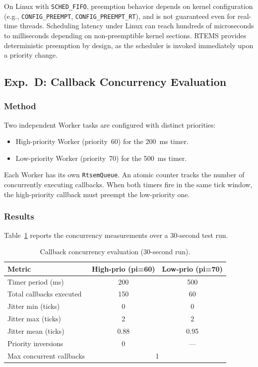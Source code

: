 On Linux with \texttt{SCHED\_FIFO}, preemption behavior depends on kernel configuration (e.g., \texttt{CONFIG\_PREEMPT}, \texttt{CONFIG\_PREEMPT\_RT}), and is not guaranteed even for real-time threads.
Scheduling latency under Linux can reach hundreds of microseconds to milliseconds depending on non-preemptible kernel sections.
RTEMS provides deterministic preemption by design, as the scheduler is invoked immediately upon a priority change.

\subsection{Exp.\ D: Callback Concurrency Evaluation}

\subsubsection{Method}

Two independent Worker tasks are configured with distinct priorities:
\begin{itemize}
    \item High-priority Worker (priority~60) for the 200~ms timer.
    \item Low-priority Worker (priority~70) for the 500~ms timer.
\end{itemize}
Each Worker has its own \texttt{RtsemQueue}.
An atomic counter tracks the number of concurrently executing callbacks.
When both timers fire in the same tick window, the high-priority callback must preempt the low-priority one.

\subsubsection{Results}

Table~\ref{tab:concurrency} reports the concurrency measurements over a 30-second test run.

\begin{table}[t]
\centering
\caption{Callback concurrency evaluation (30-second run).}
\label{tab:concurrency}
\begin{tabular}{lcc}
\hline
\textbf{Metric} & \textbf{High-prio (pi=60)} & \textbf{Low-prio (pi=70)} \\
\hline
Timer period (ms)          & 200   & 500  \\
Total callbacks executed   & 150   & 60   \\
Jitter min (ticks)        & 0     & 0    \\
Jitter max (ticks)        & 2     & 2    \\
Jitter mean (ticks)       & 0.88  & 0.95 \\
Priority inversions       & 0     & ---  \\
Max concurrent callbacks  & \multicolumn{2}{c}{1} \\
\hline
\end{tabular}
\end{table}

